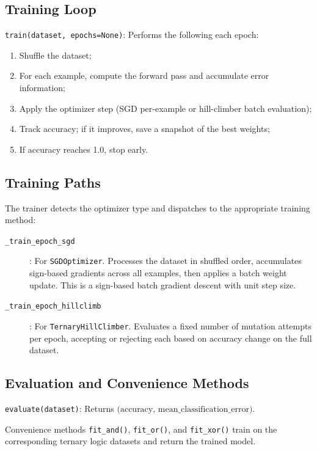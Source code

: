 \documentclass[10pt,a4paper,twoside]{book}
\begin{document}
\subsection{Training Loop}

\noindent\texttt{train(dataset, epochs=None)}: Performs the following
each epoch:
\begin{enumerate}
    \item Shuffle the dataset;
    \item For each example, compute the forward pass and accumulate
          error information;
    \item Apply the optimizer step (SGD per-example or hill-climber
          batch evaluation);
    \item Track accuracy; if it improves, save a snapshot of the
          best weights;
    \item If accuracy reaches 1.0, stop early.
\end{enumerate}

\subsection{Training Paths}

The trainer detects the optimizer type and dispatches to the appropriate
training method:
\begin{description}
    \item[\texttt{\_train\_epoch\_sgd}]: For \texttt{SGDOptimizer}.
          Processes the dataset in shuffled order, accumulates sign-based
          gradients across all examples, then applies a batch weight
          update. This is a sign-based batch gradient descent with unit
          step size.
    \item[\texttt{\_train\_epoch\_hillclimb}]: For
          \texttt{TernaryHillClimber}. Evaluates a fixed number of
          mutation attempts per epoch, accepting or rejecting each
          based on accuracy change on the full dataset.
\end{description}

\subsection{Evaluation and Convenience Methods}

\noindent\texttt{evaluate(dataset)}: Returns $\text{(accuracy, mean\_classification\_error)}$.

Convenience methods \texttt{fit\_and()}, \texttt{fit\_or()}, and
\texttt{fit\_xor()} train on the corresponding ternary logic datasets
and return the trained model.
\end{document}
